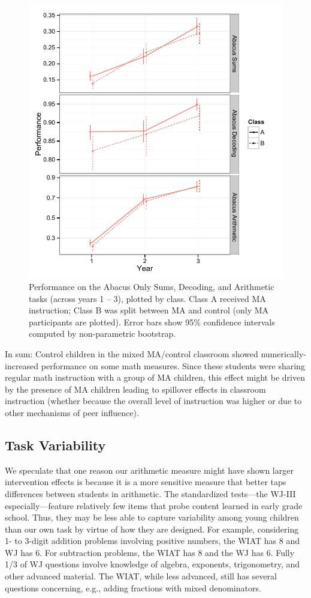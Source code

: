 \documentclass[11pt]{article}
\begin{document}
\begin{figure}[H]
\begin{center}
\includegraphics[width=4.5in]{figures/abacus_class.pdf}
\end{center}
\caption{Performance on the Abacus Only Sums, Decoding, and Arithmetic tasks (across years 1 -- 3), plotted by class. Class A received MA instruction; Class B was split between MA and control (only MA participants are plotted). Error bars show 95\% confidence intervals computed by non-parametric bootstrap.}
\label{fig:abacus_class}
\end{figure}


In sum: Control children in the mixed MA/control classroom showed numerically-increased performance on some math measures. Since these students were sharing regular math instruction with a group of MA children, this effect might be driven by the presence of MA children leading to spillover effects in classroom instruction (whether because the overall level of instruction was higher or due to other mechanisms of peer influence).

\subsection{Task Variability}

We speculate that one reason our arithmetic measure might have shown larger intervention effects is because it is a more sensitive measure that better taps differences between students in arithmetic. The standardized tests---the WJ-III especially---feature relatively few items that probe content learned in early grade school. Thus, they may be less able to capture variability among young children than our own task by virtue of how they are designed. For example, considering 1- to 3-digit addition problems involving positive numbers, the WIAT has 8 and WJ has 6. For subtraction problems, the WIAT has 8 and the WJ has 6. Fully 1/3 of WJ questions involve knowledge of algebra, exponents, trigonometry, and other advanced material. The WIAT, while less advanced, still has several questions concerning, e.g., adding fractions with mixed denominators.
\end{document}
